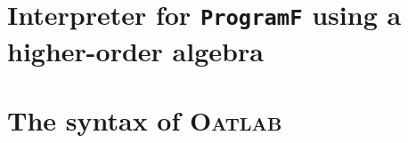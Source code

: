 \documentclass[letterpaper,11pt]{article}
\newcommand{\oatlab}{\textsc{Oatlab}}
\newcommand{\code}{\texttt}
\begin{document}
\appendix

\newpage
\section{Interpreter for \code{ProgramF} using a higher-order algebra}
\label{sec:interpreter}



\newpage
\section{The syntax of \oatlab{}}
\label{sec:oatlab-syntax}



\newpage

\end{document}
